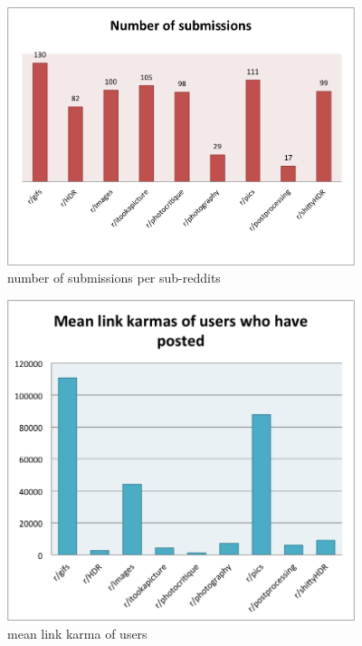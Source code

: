 \documentclass{article} %
\begin{document}
\begin{figure}[h]
\begin{center}
\includegraphics[width=4in]{graph4.png}
\caption{number of submissions per sub-reddits}
\end{center}
\end{figure}

\begin{figure}[h]
\begin{center}
\includegraphics[width=4in]{graph3.png}
\caption{mean link karma of users}
\end{center}
\end{figure}
\end{document}
